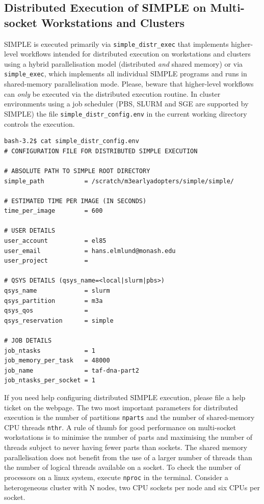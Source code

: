 \documentclass[a4paper,11pt]{article}
\begin{document}
\subsection{Distributed Execution of SIMPLE on Multi-socket Workstations and Clusters}
SIMPLE is executed primarily via \texttt{simple\_distr\_exec} that implements higher-level workflows intended for distributed execution on workstations and clusters using a hybrid parallelisation model (distributed \textit{and} shared memory) or via \texttt{simple\_exec}, which implements all individual SIMPLE programs and runs in shared-memory parallelisation mode. Please, beware that higher-level workflows can \textit{only} be executed via the distributed execution routine.  In cluster environments using a job scheduler (PBS, SLURM and SGE are supported by SIMPLE) the file \texttt{simple\_distr\_config.env} in the current working directory controls the execution.
\begin{verbatim}
bash-3.2$ cat simple_distr_config.env 
# CONFIGURATION FILE FOR DISTRIBUTED SIMPLE EXECUTION

# ABSOLUTE PATH TO SIMPLE ROOT DIRECTORY
simple_path           = /scratch/m3earlyadopters/simple/simple/

# ESTIMATED TIME PER IMAGE (IN SECONDS)
time_per_image        = 600

# USER DETAILS
user_account          = el85 
user_email            = hans.elmlund@monash.edu
user_project          = 

# QSYS DETAILS (qsys_name=<local|slurm|pbs>)
qsys_name             = slurm
qsys_partition        = m3a
qsys_qos              =
qsys_reservation      = simple

# JOB DETAILS
job_ntasks            = 1
job_memory_per_task   = 48000
job_name              = taf-dna-part2
job_ntasks_per_socket = 1
\end{verbatim}
If you need help configuring distributed SIMPLE execution, please file a help ticket on the webpage. The two most important parameters for distributed execution is the number of partitions \texttt{nparts} and the number of shared-memory CPU threads \texttt{nthr}. A rule of thumb for good performance on multi-socket workstations is to minimise the number of parts and maximising the number of threads subject to never having fewer parts than sockets. The shared memory parallelisation does not benefit from the use of a larger number of threads than the number of logical threads available on a socket. To check the number of processors on a linux system, execute \texttt{nproc} in the terminal. Consider a heterogeneous cluster with N nodes, two CPU sockets per node and six CPUs per socket.
\end{document}
